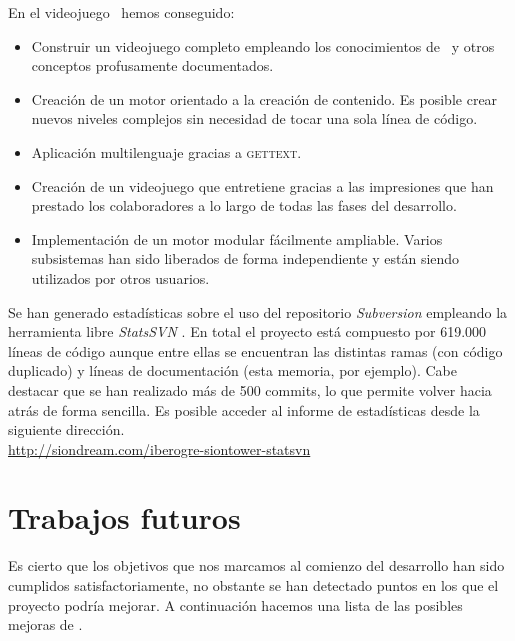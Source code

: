 En el videojuego \juego\ hemos conseguido:

\begin{itemize}
    \itemsep0em
    \item Construir un videojuego completo empleando los conocimientos de
    \wiki\ y otros conceptos profusamente documentados.
    \item Creación de un motor orientado a la creación de contenido. Es posible
    crear nuevos niveles complejos sin necesidad de tocar una sola línea
    de código.
    \item Aplicación multilenguaje gracias a \textsc{gettext}.
    \item Creación de un videojuego que entretiene gracias a las impresiones
    que han prestado los colaboradores a lo largo de todas las fases del
    desarrollo.
    \item Implementación de un motor modular fácilmente ampliable. Varios
    subsistemas han sido liberados de forma independiente y están siendo
    utilizados por otros usuarios.
\end{itemize}

Se han generado estadísticas sobre el uso del repositorio \textit{Subversion}
empleando la herramienta libre \textit{StatsSVN} \cite{website:statssvn}.
En total el proyecto está compuesto por 619.000 líneas de código aunque
entre ellas se encuentran las distintas ramas (con código duplicado)
y líneas de documentación (esta memoria, por ejemplo). Cabe destacar
que se han realizado más de 500 commits, lo que permite volver hacia atrás
de forma sencilla. Es posible acceder al informe de estadísticas desde
la siguiente dirección.\\

\url{http://siondream.com/iberogre-siontower-statsvn}\\

\section{Trabajos futuros}

Es cierto que los objetivos que nos marcamos al comienzo del desarrollo
han sido cumplidos satisfactoriamente, no obstante se han detectado puntos
en los que el proyecto podría mejorar. A continuación hacemos una lista
de las posibles mejoras de \wiki.


